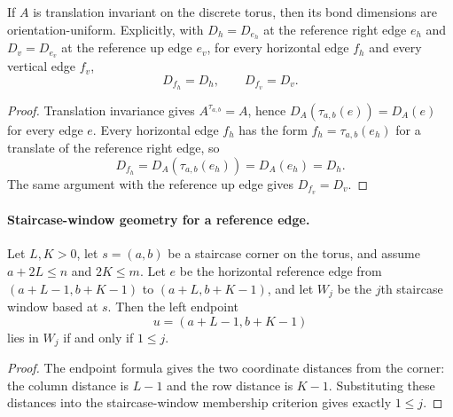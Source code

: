 \begin{theorem}%
    \label{thm:peps_torusUniformBondDim_of_translationInvariant}
    \leanok
    If $A$ is translation invariant on the discrete torus, then its bond
    dimensions are orientation-uniform. Explicitly, with
    $D_h=D_{e_h}$ at the reference right edge $e_h$ and
    $D_v=D_{e_v}$ at the reference up edge $e_v$, for every horizontal
    edge $f_h$ and every vertical edge $f_v$,
    \[
        D_{f_h}=D_h,
        \qquad
        D_{f_v}=D_v.
    \]
\end{theorem}
\begin{proof}\leanok
    Translation invariance gives $A^{\tau_{a,b}}=A$, hence
    $D_A(\tau_{a,b}(e))=D_A(e)$ for every edge $e$. Every horizontal edge
    $f_h$ has the form $f_h=\tau_{a,b}(e_h)$ for a translate of the reference
    right edge, so
    \[
        D_{f_h}
        =
        D_A(\tau_{a,b}(e_h))
        =
        D_A(e_h)
        =
        D_h.
    \]
    The same argument with the reference up edge gives $D_{f_v}=D_v$.
\end{proof}



\paragraph{Staircase-window geometry for a reference edge.}

\begin{lemma}%
    \label{lem:peps_reference_edge_left_endpoint_staircase_window}
    \leanok
    Let $L,K>0$, let $s=(a,b)$ be a staircase corner on the torus, and assume
    $a+2L\le n$ and $2K\le m$. Let $e$ be the horizontal reference edge
    from $(a+L-1,b+K-1)$ to $(a+L,b+K-1)$, and let $W_j$ be the $j$th
    staircase window based at $s$. Then the left endpoint
    \[
        u=(a+L-1,b+K-1)
    \]
    lies in $W_j$ if and only if $1\le j$.
\end{lemma}
\begin{proof}\leanok
    The endpoint formula gives the two coordinate distances from the corner:
    the column distance is $L-1$ and the row distance is $K-1$. Substituting
    these distances into the staircase-window membership criterion gives exactly
    $1\le j$.
\end{proof}

